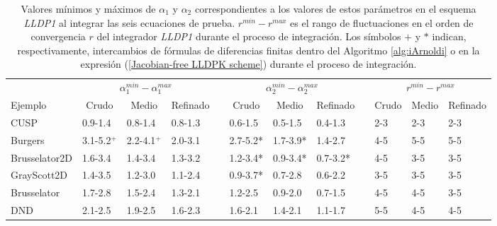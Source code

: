 \begin{table}[htb]
	\caption{Valores mínimos y máximos de $\alpha _{1}$ y $\alpha _{2}$ correspondientes a los valores de estos parámetros en el esquema \emph{LLDP1} al integrar las seis ecuaciones de prueba. $r^{min}-r^{max}$ es el rango de fluctuaciones en el orden de convergencia $r$ del integrador \emph{LLDP1} durante el proceso de integración. Los símbolos $+$ y $*$ indican, respectivamente, intercambios de fórmulas de diferencias finitas dentro del Algoritmo \ref{alg:iArnoldi} o en la expresión (\ref{Jacobian-free LLDPK scheme}) durante el proceso de integración.}
	\label{tab:R_LLDP1}
	\begin{adjustbox}{width=0.95\columnwidth,center}
		\begin{tabular}{lccccccccccc}
			& \multicolumn{3}{c}{$\alpha^{min}_{1}-\alpha^{max}_{1}$} &  & \multicolumn{3}{c}{$\alpha^{min}_{2}-\alpha^{max}_{2}$} &  & \multicolumn{3}{c}{$r^{min}-r^{max}$} \\
			\cline{2-4}\cline{6-8}\cline{10-12} Ejemplo & Crudo & Medio & Refinado &  & Crudo & Medio & Refinado &  & Crudo & Medio & Refinado \\
			\hline
			CUSP & \multicolumn{1}{l}{0.9-1.4} & \multicolumn{1}{l}{0.8-1.4} & \multicolumn{1}{l}{0.8-1.3} &  & \multicolumn{1}{l}{0.6-1.5} & \multicolumn{1}{l}{0.5-1.5} & \multicolumn{1}{l}{0.4-1.3} &  & \multicolumn{1}{l}{2-3} & \multicolumn{1}{l}{2-3} & \multicolumn{1}{l}{2-3} \\
			Burgers & \multicolumn{1}{l}{3.1-5.2$^+$} & \multicolumn{1}{l}{2.2-4.1$^+$} & \multicolumn{1}{l}{2.0-3.1} &  & \multicolumn{1}{l}{2.7-5.2*} & \multicolumn{1}{l}{1.7-3.9*} & \multicolumn{1}{l}{1.4-2.7} &  & \multicolumn{1}{l}{4-5} & \multicolumn{1}{l}{5-5} & \multicolumn{1}{l}{5-5} \\
			Brusselator2D & \multicolumn{1}{l}{1.6-3.4} & \multicolumn{1}{l}{1.4-3.4} & \multicolumn{1}{l}{1.3-3.2} &  & \multicolumn{1}{l}{1.2-3.4*} & \multicolumn{1}{l}{0.9-3.4*} & \multicolumn{1}{l}{0.7-3.2*} &  & \multicolumn{1}{l}{4-5} & \multicolumn{1}{l}{3-5} & \multicolumn{1}{l}{3-5} \\
			GrayScott2D & \multicolumn{1}{l}{1.4-3.5} & \multicolumn{1}{l}{1.2-3.0} & \multicolumn{1}{l}{1.1-2.4} &  & \multicolumn{1}{l}{0.9-3.7*} & \multicolumn{1}{l}{0.7-2.8} & \multicolumn{1}{l}{0.6-2.2} &  & \multicolumn{1}{l}{3-5} & \multicolumn{1}{l}{3-5} & \multicolumn{1}{l}{3-5} \\
			Brusselator & \multicolumn{1}{l}{1.7-2.8} & \multicolumn{1}{l}{1.5-2.4} & \multicolumn{1}{l}{1.3-2.1} &  & \multicolumn{1}{l}{1.2-2.5} & \multicolumn{1}{l}{0.9-2.0} & \multicolumn{1}{l}{0.7-1.5} &  & \multicolumn{1}{l}{4-5} & \multicolumn{1}{l}{4-5} & \multicolumn{1}{l}{3-5} \\
			DND & \multicolumn{1}{l}{2.1-2.5} & \multicolumn{1}{l}{1.9-2.5} & \multicolumn{1}{l}{1.6-2.3} &  & \multicolumn{1}{l}{1.6-2.1} & \multicolumn{1}{l}{1.4-2.1} & \multicolumn{1}{l}{1.1-1.7} &  & \multicolumn{1}{l}{5-5} & \multicolumn{1}{l}{4-5} & \multicolumn{1}{l}{4-5} \\
			\hline
		\end{tabular}
	\end{adjustbox}
	\vspace{1cm}
\end{table}

